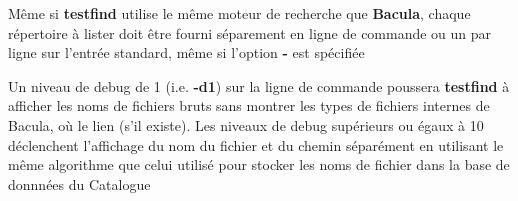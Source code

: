 Même si {\bf testfind} utilise le même moteur de recherche que {\bf Bacula}, 
chaque répertoire à lister doit être fourni séparement en ligne de commande ou
un par ligne sur l'entrée standard, même si l'option {\bf -} est spécifiée

Un niveau de debug de 1 (i.e. {\bf -d1}) sur la ligne de commande poussera
{\bf testfind} à afficher les noms de fichiers bruts sans montrer les types
de fichiers internes de Bacula, où le lien (s'il existe). Les niveaux de debug
supérieurs ou égaux à 10 déclenchent l'affichage du nom du fichier et du chemin
séparément en utilisant le même algorithme que celui utilisé pour stocker les
noms de fichier dans la base de donnnées du Catalogue

